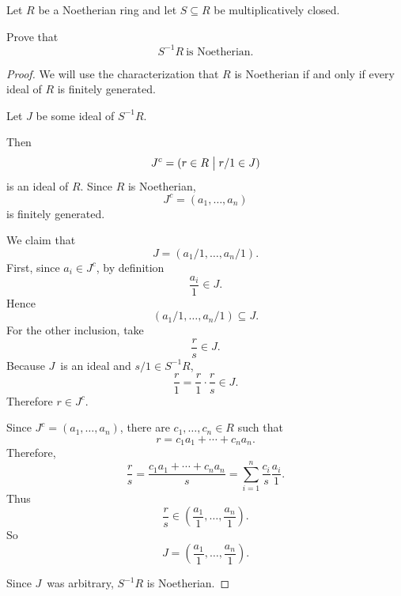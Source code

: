 \documentclass[11pt]{article}
\begin{document}
\begin{prob}
    Let $R$ be a Noetherian ring and let $S \subseteq R$ be 
    multiplicatively closed. 

    Prove that 
    \[
        S^{-1}R \ \text{is Noetherian}. 
    \]
\end{prob}
\begin{proof}
    We will use the characterization that 
    $R$ is Noetherian if and only if every ideal 
    of $R$ is finitely generated.

    Let $J$ be some ideal of $S^{-1}R$. 

    Then 
    \[
        J^c = (r \in R \bigm| r/1 \in J)
    \]
    is an ideal of $R$. 
    Since $R$ is Noetherian, 
    \[
        J^c = (a_1,\ldots,a_n)
    \]
    is finitely generated. 

    We claim that 
    \[
        J = (a_1/1, \ldots, a_n/1). 
    \]
    First, since $a_i \in J^c$, by definition 
    \[
        \frac{a_i}1 \in J. 
    \]
    Hence 
    \[
        (a_1/1,\ldots,a_n/1) \subseteq J. 
    \]
    For the other inclusion, 
    take 
    \[
        \frac{r}{s} \in J. 
    \]
    Because $J$ is an ideal and $s/1 \in S^{-1}R$,
    \[
        \frac{r}{1} = \frac{r}1 \cdot \frac{r}s \in J. 
    \]
    Therefore $r \in J^c$. 

    Since $J^c = (a_1,\ldots,a_n)$, there are 
    $c_1,\ldots,c_n \in R$ such that 
    \[
        r = c_1a_1 + \cdots + c_na_n.
    \]
    Therefore, 
    \[
        \frac{r}{s} 
        = \frac{c_1a_1+\cdots+c_na_n}{s} 
        = \sum_{i=1}^n \frac{c_i}{s}\frac{a_i}1. 
    \]
    Thus 
    \[
        \frac{r}{s} \in \left(\frac{a_1}1, \ldots, \frac{a_n}1 
        \right). 
    \]
    So 
    \[
        J = \left(\frac{a_1}1, \ldots, \frac{a_n}1 
        \right). 
    \]

    Since $J$ was arbitrary, $S^{-1}R$ is Noetherian. 
\end{proof}
\end{document}

